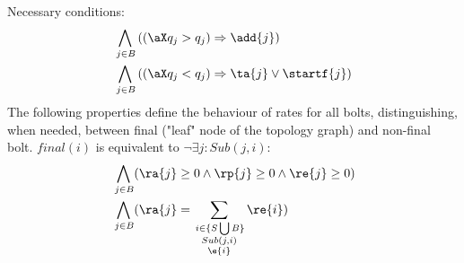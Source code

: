%
Necessary conditions:
%
\begin{align*}
 \bigwedge_{
\begin{subarray}{c}
\,j \in B
\end{subarray}
} &\left( (\aX q_j > q_j) 
\Rightarrow 
\add{j}\right)\\
%
%
 \bigwedge_{
\begin{subarray}{c}
\,j \in B
\end{subarray}
} &\left( (\aX q_j < q_j) 
\Rightarrow 
\ta{j} \lor \startf{j} \right)
%
%
\end{align*}
%
The following properties define the behaviour of rates for all bolts, distinguishing, when needed, between final ("leaf" node of the topology graph) and non-final bolt. $\mathit{final}(i)$ is equivalent to $\lnot \exists j: Sub(j,i)$:
%
%
\begin{align*}
& \bigwedge_{
\begin{subarray}{c}
\,j \in B
\end{subarray}
} ( \ra{j} \geq 0 \land \rp{j} \geq 0 \land \re{j} \geq 0 ) \\
%
%
& \bigwedge_{
\begin{subarray}{c}
\,j \in B
\end{subarray}
} ( \ra{j} = \sum_{
\begin{subarray}{c}
\,i \in \{S \bigcup B \}\\
Sub(j,i) \\
\e{i}
\end{subarray}
 } \re{i})
%
%
\end{align*}
%
%
